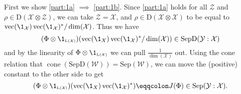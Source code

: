 \documentclass[boxes,pages,color=SeaGreen]{homework}
\newcommand{\X}{\mathcal{X}}
\newcommand{\Y}{\mathcal{Y}}
\newcommand{\Z}{\mathcal{Z}}
\newcommand{\W}{\mathcal{W}}
\newcommand{\Lin}{\mathrm{L}}
\newcommand{\Density}{\mathrm{D}}
\newcommand{\Sep}{\mathrm{Sep}}
\newcommand{\SepD}{\mathrm{SepD}}
\DeclareMathOperator{\vect}{vec}
\DeclareMathOperator{\cone}{cone}
\begin{document}
\begin{solution}
  First we show \ref{part:1a} $\implies$ \ref{part:1b}.
  Since \ref{part:1a} holds for all $\Z$ and $\rho\in\Density(\X\otimes\Z)$, we can take $\Z = \X$, and $\rho\in\Density(\X\otimes\X)$ to be equal to $\vect(\1_\X)\vect(\1_\X)^* / \dim(\X)$.
  Thus we have
  \begin{equation*}
    (\Phi \otimes \1_{\mathsmaller{\Lin(\X)}})(\vect(\1_X)\vect(\1_\X)^*/\dim(\X))\in\SepD(\Y : \X)
  \end{equation*}
  and by the linearity of $\Phi\otimes\1_\mathsmaller{\Lin(\X)}$ we can pull $\frac{1}{\dim(\X)}$ out.
  Using the cone relation that $\cone(\SepD(\W)) = \Sep(\W)$, we can move the (positive) constant to the other side to get
  \begin{equation*}
    (\Phi \otimes \1_{\mathsmaller{\Lin(\X)}})(\vect(\1_X)\vect(\1_\X)^*) \eqdef J(\Phi) \in \Sep(\Y : \X).
  \end{equation*}


\end{solution}
\end{document}
